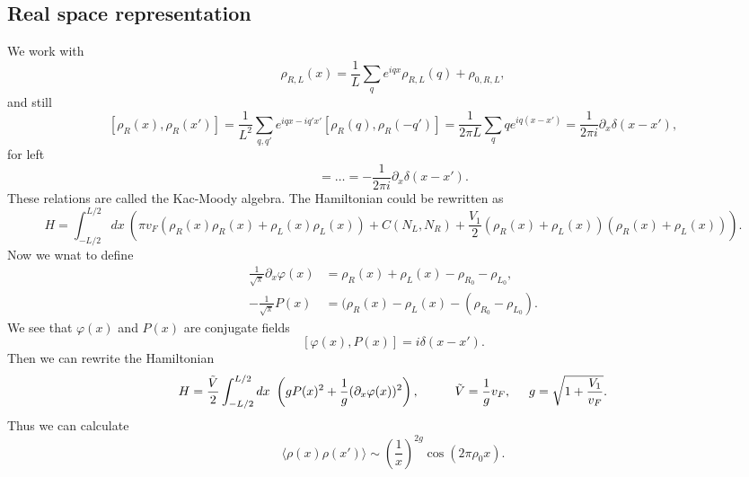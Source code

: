 


\subsection*{Real space representation}

We work with
\begin{equation*}
	\rho_{R,L}(x) = \frac{1}{L} \sum_q e^{i q x} \rho_{R,L} (q) + \rho_{0, R,L},
\end{equation*}
and still
\begin{equation*}
	\left[\rho_R(x), \rho_R(x')\right] = \frac{1}{L^2} \sum_{q,q'} e^{i q x - i q' x'} \left[
		\rho_R(q), \rho_R(-q')
	\right] = \frac{1}{2\pi L} \sum_q q e^{ i q(x-x')} = \frac{1}{2\pi i} \partial_x \delta(x-x'),
\end{equation*}
for left 
\begin{equation*}
	[\rho_L(x), \rho_L(x')] = \ldots = - \frac{1}{2\pi i} \partial_x \delta(x-x').
\end{equation*}
These relations are called the Kac-Moody algebra.  The Hamiltonian could be rewritten as 
\begin{equation*}
	H = \int_{-L/2}^{L/2} dx\ \left(
		\pi v_F \left(
			\rho_R(x) \rho_R(x) + \rho_L(x) \rho_L(x)
		\right) + C(N_L,N_R) + \frac{V_1}{2}\left(
			\rho_R(x) + \rho_L(x)
		\right) \left(
			\rho_R(x) + \rho_L(x)
		\right)
	\right).
\end{equation*}
Now we wnat to define
\begin{align*}
	\tfrac{1}{\sqrt{\pi}} \partial_x \varphi(x) &= \rho_R(x) + \rho_L(x) - \rho_{R_0} - \rho_{L_0},  \\
	- \tfrac{1}{\sqrt{\pi}} P(x) &= (\rho_R(x) - \rho_L(x) - (\rho_{R_0} - \rho_{L_0}).
\end{align*}
We see that $\varphi(x)$ and $P(x)$ are conjugate fields
\begin{equation*}
	\left[\varphi(x), P(x)\right] = i \delta(x-x').
\end{equation*}
Then we can rewrite the Hamiltonian
\begin{equation*}
	H = \frac{\tilde{V}}{2} \int_{-L/2}^{L/2} dx\ \left(
		g P(x)^2 + \frac{1}{g} (\partial_x \varphi(x))^2
	\right),
	\hspace{10 mm} 
	\tilde{V} = \frac{1}{g} v_F,
	\hspace{5 mm} 
	g = \sqrt{1 + \frac{V_1}{v_F}}.
\end{equation*}
Thus we can calculate
\begin{equation*}
	\langle \rho(x) \rho(x')\rangle \sim \left(\frac{1}{x}\right)^{2g} \cos(2 \pi \rho_0 x).
\end{equation*}



